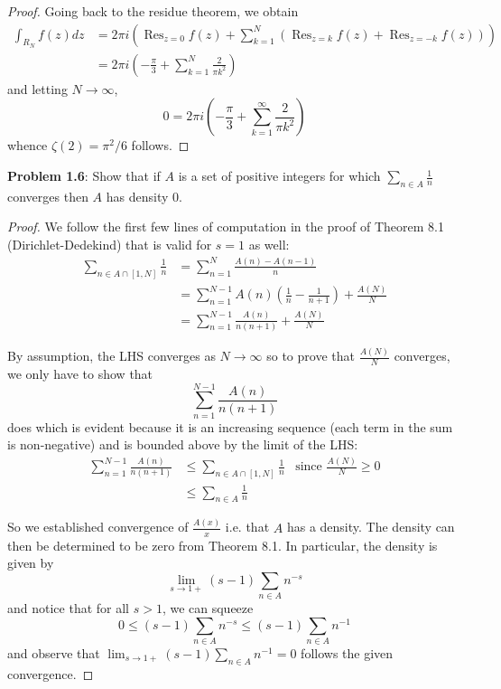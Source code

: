 \documentclass{article}
\DeclareMathOperator*{\Res}{Res}
\begin{document}
\begin{proof}
Going back to the residue theorem, we obtain
\begin{align*}
\int_{R_N} f(z) dz &= 2 \pi i \left(\Res_{z = 0} f(z) + \sum_{k = 1}^{N} (\Res_{z = k} f(z) + \Res_{z = -k} f(z)) \right)\\
&= 2 \pi i \left(-\frac{\pi}{3} + \sum_{k = 1}^{N} \frac{2}{\pi k^2} \right)
\end{align*}
and letting $N \rightarrow \infty$,
$$0 = 2 \pi i \left(-\frac{\pi}{3} + \sum_{k = 1}^{\infty} \frac{2}{\pi k^2} \right)$$
whence $\zeta(2) = \pi^2/6$ follows.
\end{proof}

\textbf{Problem 1.6}: Show that if $A$ is a set of positive integers for which $\sum_{n \in A} \frac{1}{n}$ converges then $A$ has density 0.

\begin{proof}
We follow the first few lines of computation in the proof of Theorem 8.1 (Dirichlet-Dedekind) that is valid for $s = 1$ as well:
\begin{align*}
\sum_{n \in A \cap [1, N]} \frac{1}{n} &= \sum_{n = 1}^{N} \frac{A(n) - A(n-1)}{n}\\
&= \sum_{n = 1}^{N - 1} A(n) \left(\frac{1}{n} - \frac{1}{n+1}\right) + \frac{A(N)}{N}\\
&= \sum_{n = 1}^{N - 1} \frac{A(n)}{n(n+1)} + \frac{A(N)}{N}
\end{align*}

By assumption, the LHS converges as $N \rightarrow \infty$ so to prove that $\frac{A(N)}{N}$ converges, we only have to show that
$$\sum_{n = 1}^{N - 1} \frac{A(n)}{n(n+1)}$$
does which is evident because it is an increasing sequence (each term in the sum is non-negative) and is bounded above by the limit of the LHS:
\begin{align*}
\sum_{n = 1}^{N - 1} \frac{A(n)}{n(n+1)} &\leq \sum_{n \in A \cap [1, N]} \frac{1}{n} &\text{since } \frac{A(N)}{N} \geq 0\\
&\leq \sum_{n \in A} \frac{1}{n}
\end{align*}

So we established convergence of $\frac{A(x)}{x}$ i.e. that $A$ has a density. The density can then be determined to be zero from Theorem 8.1. In particular, the density is given by
$$\lim_{s \rightarrow 1+} (s-1) \sum_{n \in A} n^{-s}$$
and notice that for all $s > 1$, we can squeeze
$$0 \leq (s-1) \sum_{n \in A} n^{-s} \leq (s - 1) \sum_{n \in A} n^{-1}$$
and observe that $\lim_{s \rightarrow 1+} (s - 1) \sum_{n \in A} n^{-1} = 0$ follows the given convergence.
\end{proof}
\end{document}
